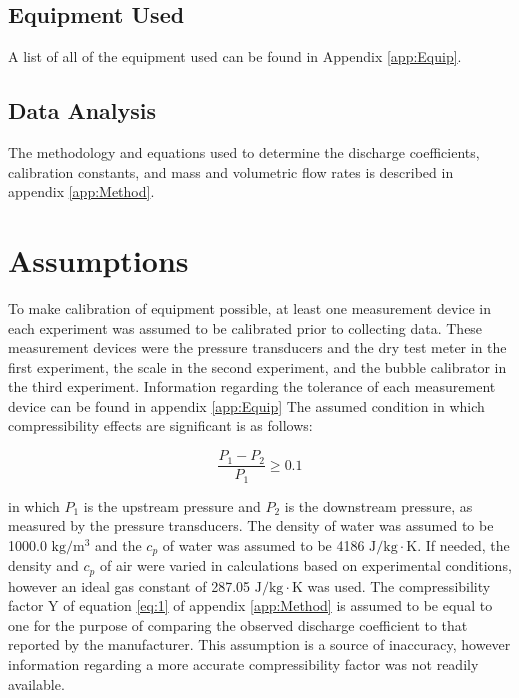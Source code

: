 \documentclass[paper=letter, fontsize=10pt]{scrartcl} %
\begin{document}
\subsection{Equipment Used}
A list of all of the equipment used can be found in Appendix \ref{app:Equip}.

\subsection{Data Analysis}
The methodology and equations used to determine the discharge coefficients, calibration constants, and mass and volumetric flow rates is described in appendix \ref{app:Method}.

\section{Assumptions}
To make calibration of equipment possible, at least one measurement device in each experiment was assumed to be calibrated prior to collecting data.  These measurement devices were the pressure transducers and the dry test meter in the first experiment, the scale in the second experiment, and the bubble calibrator in the third experiment.
Information regarding the tolerance of each measurement device can be found in appendix \ref{app:Equip}
\newline
\newline
The assumed condition in which compressibility effects are significant is as follows:

\begin{equation}
\frac{P_1 - P_2}{P_1} \geq 0.1
\end{equation}

in which \(P_1\) is the upstream pressure and \(P_2\) is the downstream pressure, as measured by the pressure transducers.
\newline
\newline
The density of water was assumed to be 1000.0 \(\text{kg}/\text{m}^3\) and the \(c_p\) of water was assumed to be 4186 \(\text{J} / \text{kg} \cdot \text{K}\).  If needed, the density and \(c_p\) of air were varied in calculations based on experimental conditions, however an ideal gas constant of 287.05 \(\text{J} /\text{kg} \cdot \text{K}\) was used.
\newline
\newline
The compressibility factor Y of equation \ref{eq:1} of appendix \ref{app:Method} is assumed to be equal to one for the purpose of comparing the observed discharge coefficient to that reported by the manufacturer.  This assumption is a source of inaccuracy, however information regarding a more accurate compressibility factor was not readily available.
\end{document}
